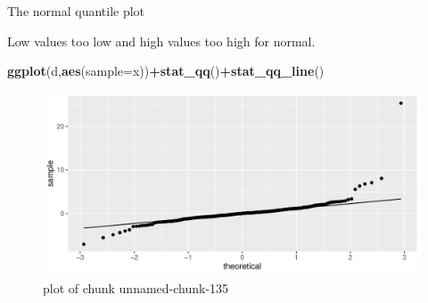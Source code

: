 \documentclass[
  ignorenonframetext,
]{beamer}
\newenvironment{Shaded}{\begin{snugshade}}{\end{snugshade}}
\newcommand{\DataTypeTok}[1]{\textcolor[rgb]{0.13,0.29,0.53}{#1}}
\newcommand{\KeywordTok}[1]{\textcolor[rgb]{0.13,0.29,0.53}{\textbf{#1}}}
\newcommand{\NormalTok}[1]{#1}
\newcommand{\OperatorTok}[1]{\textcolor[rgb]{0.81,0.36,0.00}{\textbf{#1}}}
\begin{document}
\begin{frame}[fragile]{The normal quantile plot}
\protect\hypertarget{the-normal-quantile-plot-5}{}

Low values too low and high values too high for normal.

\begin{Shaded}
\begin{Highlighting}[]
\KeywordTok{ggplot}\NormalTok{(d,}\KeywordTok{aes}\NormalTok{(}\DataTypeTok{sample=}\NormalTok{x))}\OperatorTok{+}\KeywordTok{stat_qq}\NormalTok{()}\OperatorTok{+}\KeywordTok{stat_qq_line}\NormalTok{()}
\end{Highlighting}
\end{Shaded}

\begin{figure}
\centering
\includegraphics{figure/unnamed-chunk-135-1.pdf}
\caption{plot of chunk unnamed-chunk-135}
\end{figure}

\end{frame}
\end{document}
